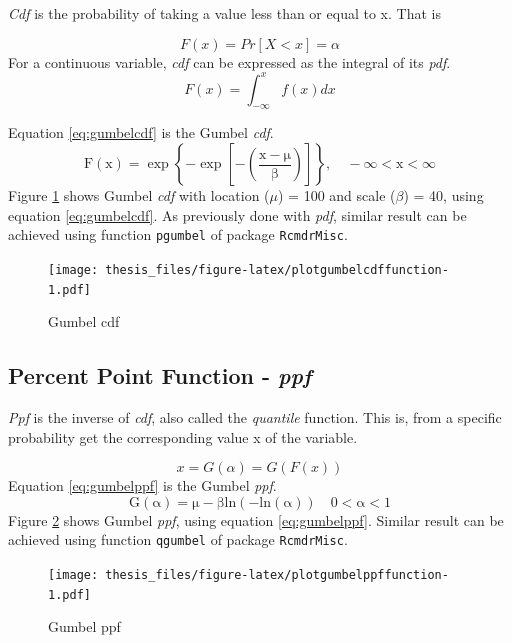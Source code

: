 \documentclass[12pt,oneside]{reedthesis}
\begin{document}
\emph{Cdf} is the probability of taking a value less than or equal to x. That is

\[
F(x) = Pr[X < x] = \alpha
\]
For a continuous variable, \emph{cdf} can be expressed as the integral of its \emph{pdf}.
\[
F(x) = \int_{-\infty}^x f(x)dx
\]

Equation \eqref{eq:gumbelcdf} is the Gumbel \emph{cdf}.
\begin{equation}
\mathrm{
        F(x) = \exp\left\{-\exp\left[-\left(\frac{x-\mu}{\beta}\right)\right]\right\}, 
        \quad -\infty < x < \infty
        }
  \label{eq:gumbelcdf}
\end{equation}
Figure \ref{fig:plotgumbelcdffunction} shows Gumbel \emph{cdf} with location (\(\mu\)) = 100 and scale (\(\beta\)) = 40, using equation \eqref{eq:gumbelcdf}. As previously done with \emph{pdf}, similar result can be achieved using function \texttt{pgumbel} of package \texttt{RcmdrMisc}.

\footnotesize
\begin{figure}
\centering
\texttt{[image: thesis\_files/figure-latex/plotgumbelcdffunction-1.pdf]}
\caption{\label{fig:plotgumbelcdffunction}Gumbel cdf}
\end{figure}
\normalsize

\hypertarget{percent-point-function---ppf}{%
\subsection{\texorpdfstring{Percent Point Function - \emph{ppf}}{Percent Point Function - ppf}}\label{percent-point-function---ppf}}

\emph{Ppf} is the inverse of \emph{cdf}, also called the \emph{quantile} function. This is, from a specific probability get the corresponding value x of the variable.

\[
x = G(\alpha) = G(F(x))
\]
Equation \eqref{eq:gumbelppf} is the Gumbel \emph{ppf}.
\begin{equation}
\mathrm{
        G(\alpha) = \mu-\beta ln(-ln(\alpha))
        \quad 0 < \alpha < 1
        }
  \label{eq:gumbelppf}
\end{equation}
Figure \ref{fig:plotgumbelppffunction} shows Gumbel \emph{ppf}, using equation \eqref{eq:gumbelppf}. Similar result can be achieved using function \texttt{qgumbel} of package \texttt{RcmdrMisc}.

\footnotesize
\begin{figure}
\centering
\texttt{[image: thesis\_files/figure-latex/plotgumbelppffunction-1.pdf]}
\caption{\label{fig:plotgumbelppffunction}Gumbel ppf}
\end{figure}
\normalsize
\end{document}
